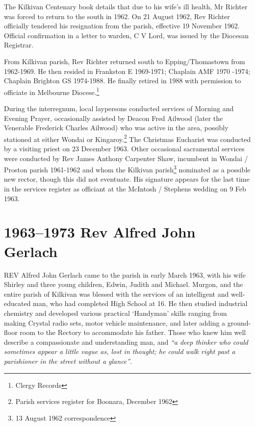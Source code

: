 The Kilkivan Centenary book details that due to his wife's ill health, Mr Richter was forced to return to the south in 1962. On 21 August 1962, Rev Richter officially tendered his resignation from the parish, effective 19 November 1962. Official confirmation in a letter to warden, C V Lord, was issued by the Diocesan Registrar.



From Kilkivan parish, Rev Richter returned south to Epping/Thomastown from 1962-1969. He then resided in Frankston E 1969-1971; Chaplain AMF 1970 -1974; Chaplain Brighton GS 1974-1988. He finally retired in 1988 with permission to officiate in Melbourne Diocese.\footnote{Clergy Records}


During the interregnum, local laypersons conducted services of Morning and Evening Prayer, occasionally assisted by Deacon Fred Ailwood (later the Venerable Frederick Charles Ailwood) who was active in the area, possibly stationed at either Wondai or Kingaroy.\footnote{Parish services register for Boonara, December 1962} The Christmas Eucharist was conducted by a visiting priest on 23 December 1963. Other occasional sacramental services were conducted by Rev James Anthony Carpenter Shaw, incumbent in Wondai / Proston parish 1961-1962 and whom the Kilkivan parish\footnote{13 August 1962 correspondence} nominated as a possible new rector, though this did not eventuate. His signature appears for the last time in the services register as officiant at the McIntosh / Stephens wedding on 9 Feb 1963.


\balance


\printendnotes[custom]
\setcounter{endnote}{0}




\chapter{1963--1973 Rev Alfred John Gerlach}
\nobalance


\lettrine[lines=3]{R}{EV}
 Alfred John Gerlach came to the parish in early March 1963, with his wife Shirley and three young children, Edwin, Judith and Michael. Murgon, and the entire parish of Kilkivan was blessed with the services of an intelligent and well-educated man, who had completed High School at 16. He then studied industrial chemistry and developed various practical `Handyman' skills ranging from making Crystal radio sets, motor vehicle maintenance, and later adding a ground-floor room to the Rectory to accommodate his father. Those who knew him well describe a compassionate and understanding man, and \emph{``a deep thinker who could sometimes appear a little vague as, lost in thought; he could walk right past a parishioner in the street without a glance''}.







